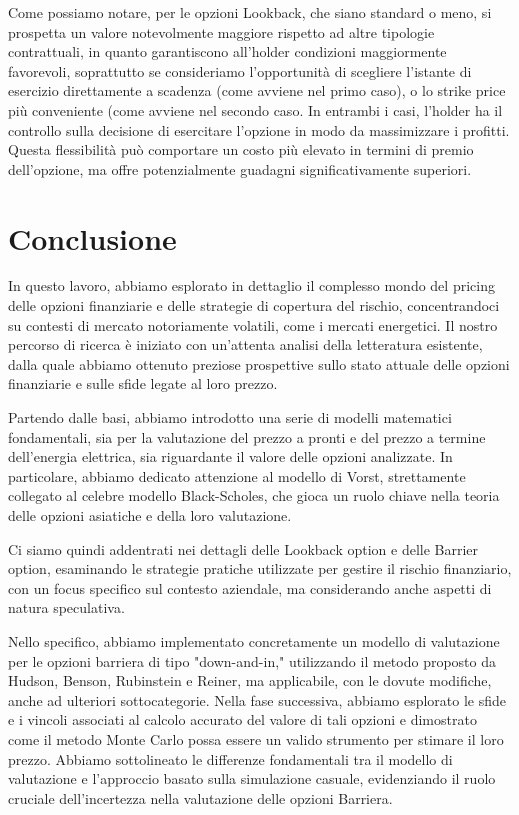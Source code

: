 \documentclass[12pt,a4paper]{report}
\begin{document}
Come possiamo notare, per le opzioni Lookback, che siano standard o meno, si prospetta un valore notevolmente maggiore rispetto ad altre tipologie contrattuali, in quanto garantiscono all'holder condizioni maggiormente favorevoli, soprattutto se consideriamo l'opportunità di scegliere l'istante di esercizio direttamente a scadenza (come avviene nel primo caso), o lo strike price più conveniente (come avviene nel secondo caso.
In entrambi i casi, l'holder ha il controllo sulla decisione di esercitare l'opzione in modo da massimizzare i profitti. Questa flessibilità può comportare un costo più elevato in termini di premio dell'opzione, ma offre potenzialmente guadagni significativamente superiori.




\chapter*{Conclusione}




In questo lavoro, abbiamo esplorato in dettaglio il complesso mondo del pricing delle opzioni finanziarie e delle strategie di copertura del rischio, concentrandoci su contesti di mercato notoriamente volatili, come i mercati energetici. Il nostro percorso di ricerca è iniziato con un'attenta analisi della letteratura esistente, dalla quale abbiamo ottenuto preziose prospettive sullo stato attuale delle opzioni finanziarie e sulle sfide legate al loro prezzo.

Partendo dalle basi, abbiamo introdotto una serie di modelli matematici fondamentali, sia per la valutazione del prezzo a pronti e del prezzo a termine dell'energia elettrica, sia riguardante il valore delle opzioni analizzate. In particolare, abbiamo dedicato attenzione al modello di Vorst, strettamente collegato al celebre modello Black-Scholes, che gioca un ruolo chiave nella teoria delle opzioni asiatiche e della loro valutazione.

Ci siamo quindi addentrati nei dettagli delle Lookback option e delle Barrier option, esaminando le strategie pratiche utilizzate per gestire il rischio finanziario, con un focus specifico sul contesto aziendale, ma considerando anche aspetti di natura speculativa.

Nello specifico, abbiamo implementato concretamente un modello di valutazione per le opzioni barriera di tipo "down-and-in," utilizzando il metodo proposto da Hudson, Benson, Rubinstein e Reiner, ma applicabile, con le dovute modifiche, anche ad ulteriori sottocategorie. Nella fase successiva, abbiamo esplorato le sfide e i vincoli associati al calcolo accurato del valore di tali opzioni e dimostrato come il metodo Monte Carlo possa essere un valido strumento per stimare il loro prezzo. Abbiamo sottolineato le differenze fondamentali tra il modello di valutazione e l'approccio basato sulla simulazione casuale, evidenziando il ruolo cruciale dell'incertezza nella valutazione delle opzioni Barriera.
\end{document}
